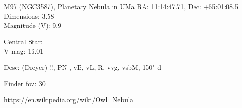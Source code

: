 \begin{block}{M97 (NGC3587), Planetary Nebula in UMa}
    RA: 11:14:47.71, Dec: +55:01:08.5 \\ 
    Dimensions: 3.58 \\ 
    Magnitude (V): 9.9

    Central Star: \\ 
      \hspace{1em}V-mag: 16.01 

    Desc: (Dreyer) !!, PN , vB, vL, R, vvg, vsbM, 150" d 

    Finder fov: 30 

    \url{https://en.wikipedia.org/wiki/Owl_Nebula} 
\end{block}